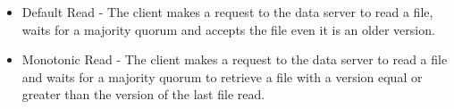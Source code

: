\begin{itemize}
\item Default Read - The client makes a request to the data server to read
a file, waits for a majority quorum and accepts the file even it is an
older version.

\item Monotonic Read - The client makes a request to the data server to read
a file and waits for a majority quorum to retrieve a file with a version equal or
greater than the version of the last file read.
\end{itemize}
